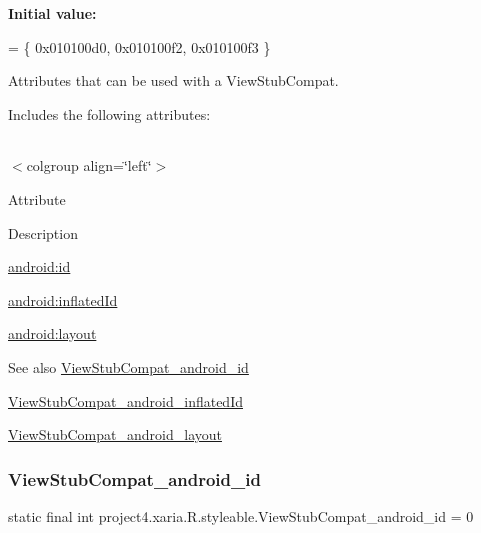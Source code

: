 {\bfseries Initial value\+:}
\begin{DoxyCode}
= \{
            0x010100d0, 0x010100f2, 0x010100f3
        \}
\end{DoxyCode}
Attributes that can be used with a View\+Stub\+Compat. 

Includes the following attributes\+:

\tabulinesep=1mm
\begin{longtabu} spread 0pt [c]{*{0}{|X[-1]}|}
\hline
\end{longtabu}
$<$colgroup align=\char`\"{}left\char`\"{}$>$ 

Attribute

Description 

{\ttfamily \hyperlink{classproject4_1_1xaria_1_1R_1_1styleable_a5e19e59ea90b0fb776887402c9ffef4d}{android\+:id}}

{\ttfamily \hyperlink{classproject4_1_1xaria_1_1R_1_1styleable_aed35f6f33d2063fd66044a9bdf7ce518}{android\+:inflated\+Id}}

{\ttfamily \hyperlink{classproject4_1_1xaria_1_1R_1_1styleable_a8256a8832d4f3ad9530b0fabe1403b69}{android\+:layout}}

\begin{DoxySeeAlso}{See also}
\hyperlink{classproject4_1_1xaria_1_1R_1_1styleable_a5e19e59ea90b0fb776887402c9ffef4d}{View\+Stub\+Compat\+\_\+android\+\_\+id} 

\hyperlink{classproject4_1_1xaria_1_1R_1_1styleable_aed35f6f33d2063fd66044a9bdf7ce518}{View\+Stub\+Compat\+\_\+android\+\_\+inflated\+Id} 

\hyperlink{classproject4_1_1xaria_1_1R_1_1styleable_a8256a8832d4f3ad9530b0fabe1403b69}{View\+Stub\+Compat\+\_\+android\+\_\+layout} 
\end{DoxySeeAlso}
\mbox{\label{classproject4_1_1xaria_1_1R_1_1styleable_a5e19e59ea90b0fb776887402c9ffef4d}} 
\subsubsection{\texorpdfstring{View\+Stub\+Compat\+\_\+android\+\_\+id}{ViewStubCompat\_android\_id}}
{\footnotesize\ttfamily static final int project4.\+xaria.\+R.\+styleable.\+View\+Stub\+Compat\+\_\+android\+\_\+id = 0\hspace{0.3cm}{\ttfamily [static]}}

